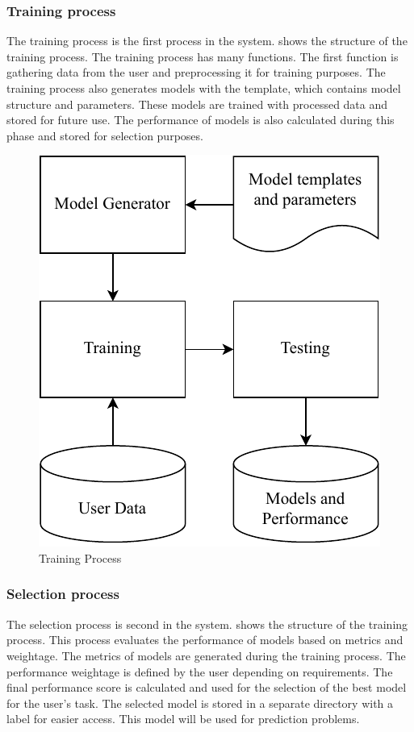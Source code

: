 \documentclass[a4paper,fleqn]{cas-dc}
\begin{document}
\subsubsection{Training process}\label{subsubsec:training_process}

The training process is the first process in the system.  shows the structure of the training process. The training process has many functions. The first function is gathering data from the user and preprocessing it for training purposes. The training process also generates models with the template, which contains model structure and parameters. These models are trained with processed data and stored for future use. The performance of models is also calculated during this phase and stored for selection purposes.

\begin{figure}[ht]
    \centering
    \includegraphics[width=0.7\columnwidth]{training_and_testing.pdf}
    \caption{Training Process}
    \label{fig:training_process}
\end{figure}

\subsubsection{Selection process}\label{subsubsec:selection_process}

The selection process is second in the system.  shows the structure of the training process. This process evaluates the performance of models based on metrics and weightage. The metrics of models are generated during the training process. The performance weightage is defined by the user depending on requirements. The final performance score is calculated and used for the selection of the best model for the user's task. The selected model is stored in a separate directory with a label for easier access. This model will be used for prediction problems.
\end{document}
